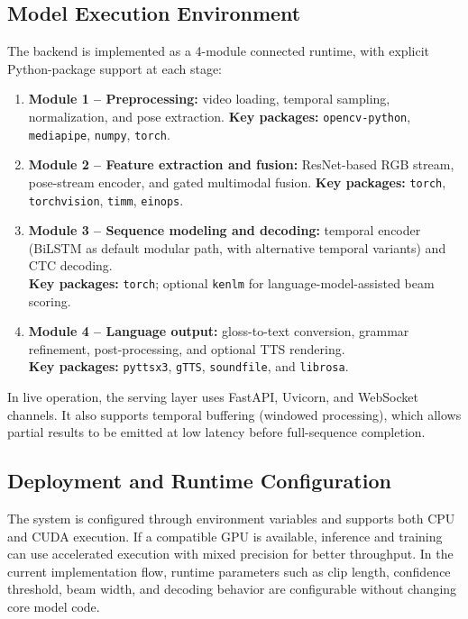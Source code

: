 \subsection{Model Execution Environment}
The backend is implemented as a 4-module connected runtime, with explicit Python-package support at each stage:
\begin{enumerate}[leftmargin=1.5em]
\item \textbf{Module 1 -- Preprocessing:} video loading, temporal sampling, normalization, and pose extraction. \textbf{Key packages:} \texttt{opencv-python}, \texttt{mediapipe}, \texttt{numpy}, \texttt{torch}.
\item \textbf{Module 2 -- Feature extraction and fusion:} ResNet-based RGB stream, pose-stream encoder, and gated multimodal fusion. \textbf{Key packages:} \texttt{torch}, \texttt{torchvision}, \texttt{timm}, \texttt{einops}.
\item \textbf{Module 3 -- Sequence modeling and decoding:} temporal encoder (BiLSTM as default modular path, with alternative temporal variants) and CTC decoding.\\
\textbf{Key packages:} \texttt{torch}; optional \texttt{kenlm} for language-model-assisted beam scoring.
\item \textbf{Module 4 -- Language output:} gloss-to-text conversion, grammar refinement, post-processing, and optional TTS rendering.\\
\textbf{Key packages:} \texttt{pyttsx3}, \texttt{gTTS}, \texttt{soundfile}, and \texttt{librosa}.
\end{enumerate}

In live operation, the serving layer uses FastAPI, Uvicorn, and WebSocket channels.
It also supports temporal buffering (windowed processing), which allows partial results to be emitted at low latency before full-sequence completion.

\subsection{Deployment and Runtime Configuration}
The system is configured through environment variables and supports both CPU and CUDA execution. If a compatible GPU is available, inference and training can use accelerated execution with mixed precision for better throughput. In the current implementation flow, runtime parameters such as clip length, confidence threshold, beam width, and decoding behavior are configurable without changing core model code.

